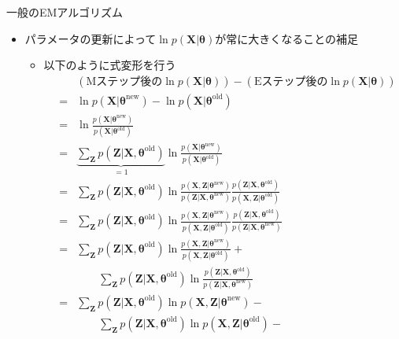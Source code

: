 \documentclass[dvipdfmx,notheorems,t]{beamer}
\begin{document}
\begin{frame}{一般のEMアルゴリズム}

\begin{itemize}
	\item パラメータの更新によって$\ln p(\bm{X} | \bm{\theta})$が常に大きくなることの補足
	\begin{itemize}
		\item 以下のように式変形を行う
		\begin{eqnarray}
			&& \left( \text{Mステップ後の}\ln p(\bm{X} | \bm{\theta}) \right) - \left( \text{Eステップ後の}\ln p(\bm{X} | \bm{\theta}) \right) \nonumber \\
			&=& \ln p(\bm{X} | \bm{\theta}^\mathrm{new}) - \ln p(\bm{X} | \bm{\theta}^\mathrm{old}) \nonumber \\
			&=& \ln \frac{p(\bm{X} | \bm{\theta}^\mathrm{new})}{p(\bm{X} | \bm{\theta}^\mathrm{old})} \nonumber \\
			&=& \underbrace{\sum_{\bm{Z}} p(\bm{Z} | \bm{X}, \bm{\theta}^\mathrm{old})}_{=1} \ln \frac{p(\bm{X} | \bm{\theta}^\mathrm{new})}{p(\bm{X} | \bm{\theta}^\mathrm{old})} \nonumber \\
			&=& \sum_{\bm{Z}} p(\bm{Z} | \bm{X}, \bm{\theta}^\mathrm{old}) \ln \frac{p(\bm{X}, \bm{Z} | \bm{\theta}^\mathrm{new})}{p(\bm{Z} | \bm{X}, \bm{\theta}^\mathrm{new})} \frac{p(\bm{Z} | \bm{X}, \bm{\theta}^\mathrm{old})}{p(\bm{X}, \bm{Z} | \bm{\theta}^\mathrm{old})} \nonumber \\
			&=& \sum_{\bm{Z}} p(\bm{Z} | \bm{X}, \bm{\theta}^\mathrm{old}) \ln \frac{p(\bm{X}, \bm{Z} | \bm{\theta}^\mathrm{new})}{p(\bm{X}, \bm{Z} | \bm{\theta}^\mathrm{old})} \frac{p(\bm{Z} | \bm{X}, \bm{\theta}^\mathrm{old})}{p(\bm{Z} | \bm{X}, \bm{\theta}^\mathrm{new})} \nonumber \\
			&=& \sum_{\bm{Z}} p(\bm{Z} | \bm{X}, \bm{\theta}^\mathrm{old}) \ln \frac{p(\bm{X}, \bm{Z} | \bm{\theta}^\mathrm{new})}{p(\bm{X}, \bm{Z} | \bm{\theta}^\mathrm{old})} + \nonumber \\
			&& \qquad \sum_{\bm{Z}} p(\bm{Z} | \bm{X}, \bm{\theta}^\mathrm{old}) \ln \frac{p(\bm{Z} | \bm{X}, \bm{\theta}^\mathrm{old})}{p(\bm{Z} | \bm{X}, \bm{\theta}^\mathrm{new})} \nonumber \\
			&=& \sum_{\bm{Z}} p(\bm{Z} | \bm{X}, \bm{\theta}^\mathrm{old}) \ln p(\bm{X}, \bm{Z} | \bm{\theta}^\mathrm{new}) - \nonumber \\
			&& \qquad \sum_{\bm{Z}} p(\bm{Z} | \bm{X}, \bm{\theta}^\mathrm{old}) \ln p(\bm{X}, \bm{Z} | \bm{\theta}^\mathrm{old}) - \nonumber \\

\end{eqnarray}
\end{itemize}
\end{itemize}
\end{frame}
\end{document}
